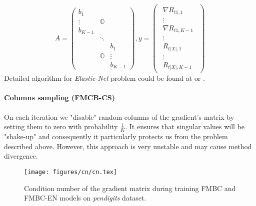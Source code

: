 \documentclass{article}
\begin{document}
\[
A =
\begin{pmatrix}
	b_{1}     		& 				&		  \\
	\vdots			& \mathbb{O}  	&		  \\
	b_{K-1}			& 				&		  \\
					& \ddots		&		  \\
					&   			& b_{1}	  \\
					& \mathbb{O}	& \vdots  \\
					& 				& b_{K-1}
\end{pmatrix},
y=\begin{pmatrix}\begin{array}{l}
	\nabla R_{t1,1}		\\
	\vdots				\\
	\nabla R_{t1,K-1}	\\

	\vdots				\\
	
	R_{t|X|,1}		\\
	\vdots				\\
	R_{t|X|,K-1}
\end{array}\end{pmatrix}
\]
Detailed algorithm for \emph{Elastic-Net} problem could be found at \cite{elasticnet05} or \cite{Hastie_theelements}.

\paragraph{Columns sampling (FMCB-CS)}
On each iteration we "disable" random columns of the gradient's matrix by setting them to zero with probability $\frac{1}{K}$. It ensures that singular values will be "shake-up" and consequently it particularly protects us from the problem described above. However, this approach is very unstable and may cause method divergence.

\begin{figure}
\vskip 0.2in
\begin{center}
\centerline{\texttt{[image: figures/cn/cn.tex]}}
\caption{Condition number of the gradient matrix during training FMBC and FMBC-EN models on \emph{pendigits} dataset.}
\end{center}
\label{fig:condition_number}
\vskip -0.2in
\end{figure}
\end{document}
